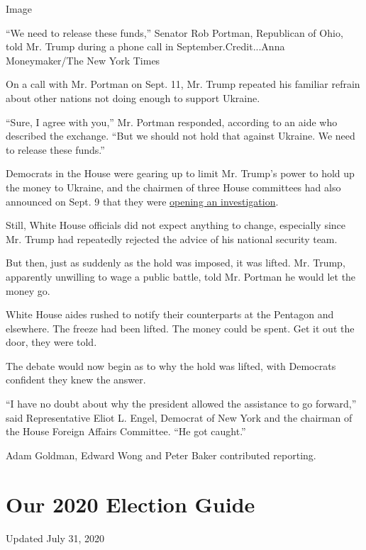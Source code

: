 Image

``We need to release these funds,'' Senator Rob Portman, Republican of
Ohio, told Mr. Trump during a phone call in September.Credit...Anna
Moneymaker/The New York Times

On a call with Mr. Portman on Sept. 11, Mr. Trump repeated his familiar
refrain about other nations not doing enough to support Ukraine.

``Sure, I agree with you,'' Mr. Portman responded, according to an aide
who described the exchange. ``But we should not hold that against
Ukraine. We need to release these funds.''

Democrats in the House were gearing up to limit Mr. Trump's power to
hold up the money to Ukraine, and the chairmen of three House committees
had also announced on Sept. 9 that they were
\href{https://foreignaffairs.house.gov/press-releases?ID=D365D32B-D9D1-4A68-B07E-28B95DA593B0}{opening
an investigation}.

Still, White House officials did not expect anything to change,
especially since Mr. Trump had repeatedly rejected the advice of his
national security team.

But then, just as suddenly as the hold was imposed, it was lifted. Mr.
Trump, apparently unwilling to wage a public battle, told Mr. Portman he
would let the money go.

White House aides rushed to notify their counterparts at the Pentagon
and elsewhere. The freeze had been lifted. The money could be spent. Get
it out the door, they were told.

The debate would now begin as to why the hold was lifted, with Democrats
confident they knew the answer.

``I have no doubt about why the president allowed the assistance to go
forward,'' said Representative Eliot L. Engel, Democrat of New York and
the chairman of the House Foreign Affairs Committee. ``He got caught.''

Adam Goldman, Edward Wong and Peter Baker contributed reporting.

\hypertarget{our-2020-election-guide}{%
\section{Our 2020 Election Guide}\label{our-2020-election-guide}}

Updated July 31, 2020

